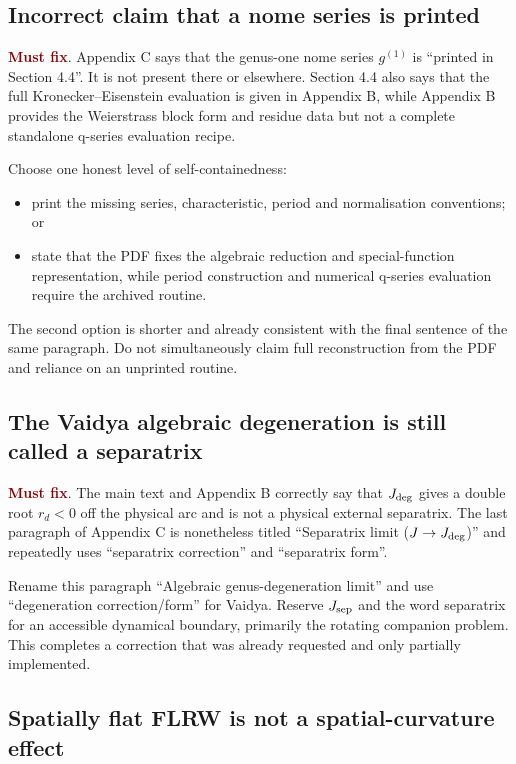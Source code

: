 \documentclass[11pt,a4paper]{article}
\newcommand{\must}{\textcolor{DarkRed}{\textbf{Must fix}}}
\begin{document}
\subsection{Incorrect claim that a nome series is printed}

\must. Appendix C says that the genus-one nome series $g^{(1)}$ is ``printed in
Section 4.4''. It is not present there or elsewhere. Section 4.4 also says that the full
Kronecker--Eisenstein evaluation is given in Appendix B, while Appendix B provides the
Weierstrass block form and residue data but not a complete standalone q-series evaluation
recipe.

Choose one honest level of self-containedness:
\begin{itemize}
  \item print the missing series, characteristic, period and normalisation conventions; or
  \item state that the PDF fixes the algebraic reduction and special-function representation,
  while period construction and numerical q-series evaluation require the archived routine.
\end{itemize}
The second option is shorter and already consistent with the final sentence of the same
paragraph. Do not simultaneously claim full reconstruction from the PDF and reliance on an
unprinted routine.

\subsection{The Vaidya algebraic degeneration is still called a separatrix}

\must. The main text and Appendix B correctly say that $J_{\rm deg}$ gives a double root
$r_d<0$ off the physical arc and is not a physical external separatrix. The last paragraph of
Appendix C is nonetheless titled ``Separatrix limit ($J\to J_{\rm deg}$)'' and repeatedly
uses ``separatrix correction'' and ``separatrix form''.

Rename this paragraph ``Algebraic genus-degeneration limit'' and use ``degeneration
correction/form'' for Vaidya. Reserve $J_{\rm sep}$ and the word separatrix for an accessible
dynamical boundary, primarily the rotating companion problem. This completes a correction that
was already requested and only partially implemented.

\subsection{Spatially flat FLRW is not a spatial-curvature effect}
\end{document}
